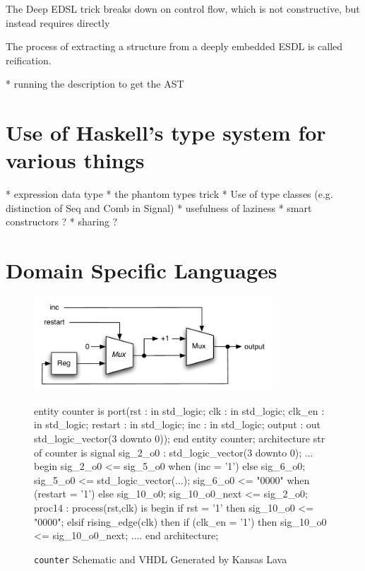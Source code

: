 \documentclass[11pt]{article}
\begin{document}
The Deep EDSL trick breaks down on control flow,
which is not constructive, but instead requires
directly 

The process of extracting a structure from a deeply embedded ESDL
is called reification. 

 * running the description to get the AST 

\section{Use of Haskell’s type system for various things }

 * expression data type 
 * the phantom types trick 
 * Use of type classes (e.g. distinction of Seq and Comb in Signal) 
 * usefulness of laziness 
 * smart constructors ? 
 * sharing ?



\section{Domain Specific Languages}






\begin{figure}[!t]
  \centering
  \begin{minipage}{0.5\textwidth}
    \centering
    \includegraphics[width=0.8\textwidth]{images/Counter.pdf}
  \end{minipage}\begin{minipage}{0.5\textwidth}
     \centering
\footnotesize\begin{Code}[fontsize=\tiny]
entity counter is
  port(rst : in std_logic;
       clk : in std_logic;
       clk_en : in std_logic;
       restart : in std_logic;
       inc : in std_logic;
       output : out std_logic_vector(3 downto 0));
end entity counter;
architecture str of counter is
  signal sig_2_o0 : std_logic_vector(3 downto 0);
  ...
begin
  sig_2_o0 <= sig_5_o0 when (inc = '1')  else sig_6_o0;
  sig_5_o0 <= std_logic_vector(...);
  sig_6_o0 <= "0000" when (restart = '1') else sig_10_o0;
  sig_10_o0_next <= sig_2_o0;
  proc14 : process(rst,clk) is
  begin
    if rst = '1' then
      sig_10_o0 <= "0000";
    elsif rising_edge(clk) then
      if (clk_en = '1') then
        sig_10_o0 <= sig_10_o0_next;
  ....
end architecture;
\end{Code}
  \end{minipage}
  \caption{{\tt counter} Schematic and VHDL Generated by Kansas Lava}
  \label{fig:counter-pictureX}
\end{figure}
\end{document}
